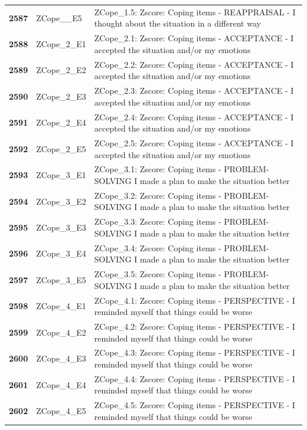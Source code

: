 \documentclass[
  letterpaper,
  DIV=11,
  numbers=noendperiod]{scrartcl}
\begin{document}
\begin{longtable}[t]{>{}cll}
\textbf{2587} & ZCope\_\_E5 & ZCope\_1.5: Zscore:  Coping items - REAPPRAISAL - I thought about the situation in a different way\\
\textbf{2588} & ZCope\_2\_E1 & ZCope\_2.1: Zscore:  Coping items - ACCEPTANCE - I accepted the situation and/or my emotions\\
\textbf{2589} & ZCope\_2\_E2 & ZCope\_2.2: Zscore:  Coping items - ACCEPTANCE - I accepted the situation and/or my emotions\\
\textbf{2590} & ZCope\_2\_E3 & ZCope\_2.3: Zscore:  Coping items - ACCEPTANCE - I accepted the situation and/or my emotions\\
\addlinespace
\textbf{2591} & ZCope\_2\_E4 & ZCope\_2.4: Zscore:  Coping items - ACCEPTANCE - I accepted the situation and/or my emotions\\
\textbf{2592} & ZCope\_2\_E5 & ZCope\_2.5: Zscore:  Coping items - ACCEPTANCE - I accepted the situation and/or my emotions\\
\textbf{2593} & ZCope\_3\_E1 & ZCope\_3.1: Zscore:  Coping items - PROBLEM-SOLVING I made a plan to make the situation better\\
\textbf{2594} & ZCope\_3\_E2 & ZCope\_3.2: Zscore:  Coping items - PROBLEM-SOLVING I made a plan to make the situation better\\
\textbf{2595} & ZCope\_3\_E3 & ZCope\_3.3: Zscore:  Coping items - PROBLEM-SOLVING I made a plan to make the situation better\\
\addlinespace
\textbf{2596} & ZCope\_3\_E4 & ZCope\_3.4: Zscore:  Coping items - PROBLEM-SOLVING I made a plan to make the situation better\\
\textbf{2597} & ZCope\_3\_E5 & ZCope\_3.5: Zscore:  Coping items - PROBLEM-SOLVING I made a plan to make the situation better\\
\textbf{2598} & ZCope\_4\_E1 & ZCope\_4.1: Zscore:  Coping items - PERSPECTIVE - I reminded myself that things could be worse\\
\textbf{2599} & ZCope\_4\_E2 & ZCope\_4.2: Zscore:  Coping items - PERSPECTIVE - I reminded myself that things could be worse\\
\textbf{2600} & ZCope\_4\_E3 & ZCope\_4.3: Zscore:  Coping items - PERSPECTIVE - I reminded myself that things could be worse\\
\addlinespace
\textbf{2601} & ZCope\_4\_E4 & ZCope\_4.4: Zscore:  Coping items - PERSPECTIVE - I reminded myself that things could be worse\\
\textbf{2602} & ZCope\_4\_E5 & ZCope\_4.5: Zscore:  Coping items - PERSPECTIVE - I reminded myself that things could be worse\\

\end{longtable}
\end{document}
